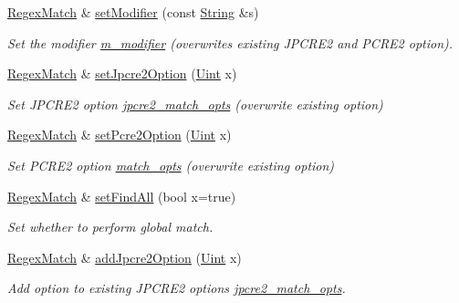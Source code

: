 \begin{DoxyCompactItemize}
\hyperlink{classjpcre2_1_1RegexMatch}{Regex\+Match} \& \hyperlink{classjpcre2_1_1RegexMatch_a9df7e92f96b61553f62720cb8f5f23e5}{set\+Modifier} (const \hyperlink{namespacejpcre2_a91f03070152fb228bc116c5a737f1d16}{String} \&s)
\begin{DoxyCompactList}\small\item\em Set the modifier \hyperlink{classjpcre2_1_1RegexMatch_a5d3e216a4cfc80d00fc45c51a8136821}{m\+\_\+modifier} (overwrites existing J\+P\+C\+R\+E2 and P\+C\+R\+E2 option). \end{DoxyCompactList}\item 
\hyperlink{classjpcre2_1_1RegexMatch}{Regex\+Match} \& \hyperlink{classjpcre2_1_1RegexMatch_a0d76033d9c134caa9ddfc21849603920}{set\+Jpcre2\+Option} (\hyperlink{namespacejpcre2_a078242d38221a13fb3543b9edd78c099}{Uint} x)
\begin{DoxyCompactList}\small\item\em Set J\+P\+C\+R\+E2 option \hyperlink{classjpcre2_1_1RegexMatch_a70d62df887eeed237724f64fbc378700}{jpcre2\+\_\+match\+\_\+opts} (overwrite existing option) \end{DoxyCompactList}\item 
\hyperlink{classjpcre2_1_1RegexMatch}{Regex\+Match} \& \hyperlink{classjpcre2_1_1RegexMatch_ae4ab558c2bec0bc9639dbca70ab47496}{set\+Pcre2\+Option} (\hyperlink{namespacejpcre2_a078242d38221a13fb3543b9edd78c099}{Uint} x)
\begin{DoxyCompactList}\small\item\em Set P\+C\+R\+E2 option \hyperlink{classjpcre2_1_1RegexMatch_a697d5731007350b0f20d2018fcfafa90}{match\+\_\+opts} (overwrite existing option) \end{DoxyCompactList}\item 
\hyperlink{classjpcre2_1_1RegexMatch}{Regex\+Match} \& \hyperlink{classjpcre2_1_1RegexMatch_a85bdec86583f800dafcb1aae27f855e7}{set\+Find\+All} (bool x=true)
\begin{DoxyCompactList}\small\item\em Set whether to perform global match. \end{DoxyCompactList}\item 
\hyperlink{classjpcre2_1_1RegexMatch}{Regex\+Match} \& \hyperlink{classjpcre2_1_1RegexMatch_a0a4cf8554a7e00f3cf2db34f60a43f60}{add\+Jpcre2\+Option} (\hyperlink{namespacejpcre2_a078242d38221a13fb3543b9edd78c099}{Uint} x)
\begin{DoxyCompactList}\small\item\em Add option to existing J\+P\+C\+R\+E2 options \hyperlink{classjpcre2_1_1RegexMatch_a70d62df887eeed237724f64fbc378700}{jpcre2\+\_\+match\+\_\+opts}. \end{DoxyCompactList}\item 

\end{DoxyCompactItemize}
